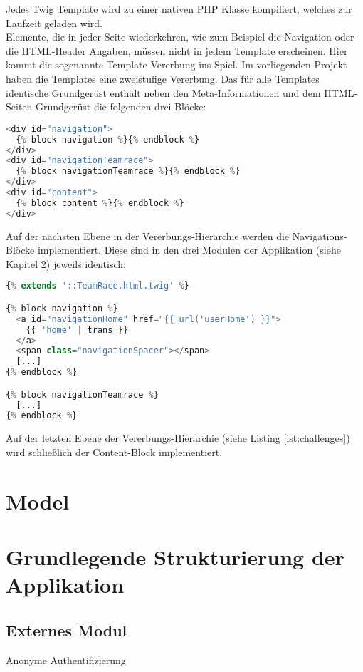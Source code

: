 \documentclass[12pt]{report}
\begin{document}
Jedes Twig Template wird zu einer nativen PHP Klasse kompiliert, welches zur Laufzeit geladen wird.\\

Elemente, die in jeder Seite wiederkehren, wie zum Beispiel die Navigation oder die HTML-Header Angaben, müssen nicht in jedem Template erscheinen. Hier kommt die sogenannte Template-Vererbung ins Spiel. Im vorliegenden Projekt haben die Templates eine zweistufige Vererbung. Das für alle Templates identische Grundgerüst enthält neben den Meta-Informationen und dem HTML-Seiten Grundgerüst die folgenden drei Blöcke:
\begin{lstlisting}[language=PHP, caption=Auszug aus app/Resources/views/TeamRace.html.twig]
<div id="navigation">
  {% block navigation %}{% endblock %}
</div>
<div id="navigationTeamrace">
  {% block navigationTeamrace %}{% endblock %}
</div>
<div id="content">
  {% block content %}{% endblock %}
</div>
\end{lstlisting}

Auf der nächsten Ebene in der Vererbungs-Hierarchie werden die Navigations-Blöcke implementiert. Diese sind in den drei Modulen der Applikation (siehe Kapitel \ref{sec:ApplikationsStruktur}) jeweils identisch: 
\begin{lstlisting}[language=PHP, caption=Auszug aus \\src/TeamRace/WebBundle/Resources/views/Teamrace/\_layout.html.twig]
{% extends '::TeamRace.html.twig' %}

{% block navigation %}
  <a id="navigationHome" href="{{ url('userHome') }}">
    {{ 'home' | trans }}
  </a>
  <span class="navigationSpacer"></span>
  [...]
{% endblock %}

{% block navigationTeamrace %}
  [...]
{% endblock %}
\end{lstlisting}

Auf der letzten Ebene der Vererbungs-Hierarchie (siehe Listing \ref{lst:challenges}) wird schließlich der Content-Block implementiert.

\section{Model}

\section{Grundlegende Strukturierung der Applikation}
\label{sec:ApplikationsStruktur}

\subsection{Externes Modul}
Anonyme Authentifizierung
\end{document}
